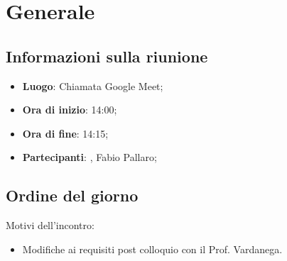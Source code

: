 \section{Generale}

\vspace{10pt}


\subsection{Informazioni sulla riunione}
\begin{itemize}
	\item \textbf{Luogo}: Chiamata Google Meet;
	\item \textbf{Ora di inizio}: 14:00;
	\item \textbf{Ora di fine}: 14:15;
	\item \textbf{Partecipanti}: \team, Fabio Pallaro;
\end{itemize}

\vspace{5pt}

\subsection{Ordine del giorno}
Motivi dell'incontro:
\begin{itemize}
	\item Modifiche ai requisiti post colloquio con il Prof. Vardanega.
\end{itemize}
